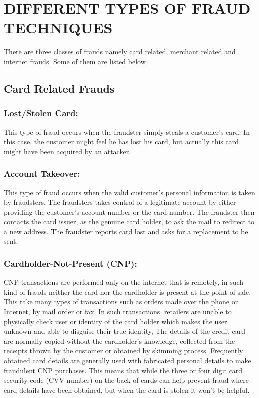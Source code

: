 \documentclass{report}
\begin{document}

\chapter{DIFFERENT TYPES OF FRAUD TECHNIQUES}

There are three classes of frauds namely card related, merchant related and internet frauds. Some of them are listed below

\section{Card Related Frauds}

\subsection{Lost/Stolen Card:}
 This type of fraud occurs when the fraudster simply steals a customer’s card. In this case, the customer might feel he has lost his card, but actually this card might have been acquired by an attacker. 

\subsection{Account Takeover:}
This type of fraud occurs when the valid customer’s personal information is taken by fraudsters. The fraudsters takes control of a legitimate account by either providing the customer’s account number or the card number. The fraudster then contacts the card issuer, as the genuine card holder, to ask the mail to redirect to a new address. The fraudster reports card lost and asks for a replacement to be sent. 

\subsection{Cardholder-Not-Present (CNP):}
CNP transactions are performed only on the internet that is remotely, in such kind of frauds neither the card nor the cardholder is present at the point-of-sale. This take many types of transactions such as orders made over the phone or Internet, by mail order or fax. In such transactions, retailers are unable to physically check user or identity of the card holder which makes the user unknown and able to disguise their true identity, The details of the credit card are normally copied without the cardholder’s knowledge, collected from the receipts thrown by the customer or obtained by skimming process. Frequently obtained card details are generally used with fabricated personal details to make fraudulent CNP purchases. This means that while the three or four digit card security code (CVV number) on the back of cards can help prevent fraud where card details have been obtained, but when the card is stolen it won’t be helpful.
 
\end{document}
